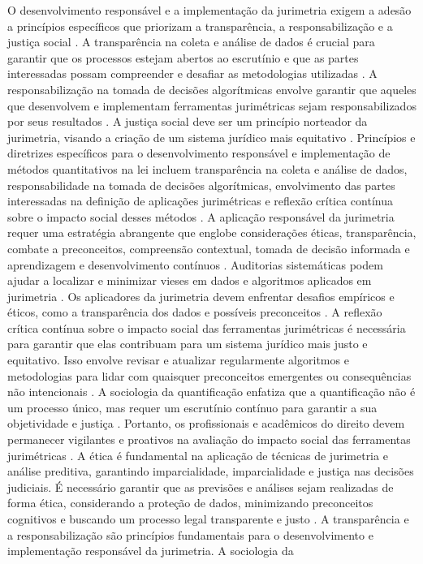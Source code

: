 \begin{agradecimentos}
    O desenvolvimento responsável e a implementação da jurimetria exigem a adesão a princípios específicos que priorizam a transparência, a responsabilização e a justiça social \cite{10.1590/dados.2022.65.3.267,10.1007/978-3-319-44000-215}. A transparência na coleta e análise de dados é crucial para garantir que os processos estejam abertos ao escrutínio e que as partes interessadas possam compreender e desafiar as metodologias utilizadas \cite{10.1590/dados.2022.65.3.267,10.1007/978-3-319-44000-215} . A responsabilização na tomada de decisões algorítmicas envolve garantir que aqueles que desenvolvem e implementam ferramentas jurimétricas sejam responsabilizados por seus resultados \cite{10.1590/dados.2022.65.3.267,10.1007/978-3-319-44000-215}. A justiça social deve ser um princípio norteador da jurimetria, visando a criação de um sistema jurídico mais equitativo \cite{10.1590/dados.2022.65.3.267,10.1007/978-3-319-44000-215}. Princípios e diretrizes específicos para o desenvolvimento responsável e implementação de métodos quantitativos na lei incluem transparência na coleta e análise de dados, responsabilidade na tomada de decisões algorítmicas, envolvimento das partes interessadas na definição de aplicações jurimétricas e reflexão crítica contínua sobre o impacto social desses métodos \cite {10.1057/s41599-020-00557-0}. A aplicação responsável da jurimetria requer uma estratégia abrangente que englobe considerações éticas, transparência, combate a preconceitos, compreensão contextual, tomada de decisão informada e aprendizagem e desenvolvimento contínuos \cite{10.1590/dados.2022.65.3.267,1023071190721}. Auditorias sistemáticas podem ajudar a localizar e minimizar vieses em dados e algoritmos aplicados em jurimetria \cite{10.1590/dados.2022.65.3.267,1023071190721}. Os aplicadores da jurimetria devem enfrentar desafios empíricos e éticos, como a transparência dos dados e possíveis preconceitos \cite{10.1590/dados.2022.65.3.267,1023071190721}. A reflexão crítica contínua sobre o impacto social das ferramentas jurimétricas é necessária para garantir que elas contribuam para um sistema jurídico mais justo e equitativo. Isso envolve revisar e atualizar regularmente algoritmos e metodologias para lidar com quaisquer preconceitos emergentes ou consequências não intencionais \cite{10.1007/s11186-021-09453-1,1023071190721}. A sociologia da quantificação enfatiza que a quantificação não é um processo único, mas requer um escrutínio contínuo para garantir a sua objetividade e justiça \cite{10.1007/s11186-021-09453-1,1023071190721}. Portanto, os profissionais e acadêmicos do direito devem permanecer vigilantes e proativos na avaliação do impacto social das ferramentas jurimétricas \cite{10.1007/s11186-021-09453-1,1023071190721}. A ética é fundamental na aplicação de técnicas de jurimetria e análise preditiva, garantindo imparcialidade, imparcialidade e justiça nas decisões judiciais. É necessário garantir que as previsões e análises sejam realizadas de forma ética, considerando a proteção de dados, minimizando preconceitos cognitivos e buscando um processo legal transparente e justo \cite{101007s1102402209481w}. A transparência e a responsabilização são princípios fundamentais para o desenvolvimento e implementação responsável da jurimetria. A sociologia da 
\end{agradecimentos}
